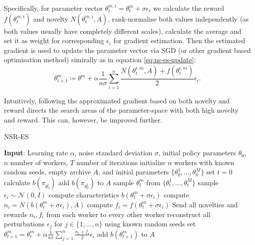 Specifically, for parameter vector $\theta_t^{m,i} = \theta_t^m+\sigma\epsilon_i$ we calculate the reward $f(\theta_t^{m,i})$ and novelty $N(\theta_t^{m,i},A)$, rank-normalise both values independently (as both values usually have completely different scales), calculate the average and set it as weight for corresponding $\epsilon_i$ for gradient estimation. Then the estimated gradient is used to update the parameter vector via SGD (or other gradient based optimisation method) simirally as in equation \ref{eq:ns-es-update}:
\begin{equation}
    \theta^m_{t+1}\coloneqq\theta^m + \alpha \frac{1}{n\sigma}\sum_{i=1}^n \dfrac{N(\theta_t^{i,m},A)+f(\theta_t^{i,m})}{2}\epsilon_i.
\end{equation}

Intuitively, following the approximated gradient based on both novelty and reward directs the search areas of the parameter-space with both high novelty and reward. This can, however, be improved further.

\begin{algorithm}
    \begin{algorithmic}[1]
    \caption{NSR-ES}
    \label{alg:nsr-es}
        \State \textbf{Input}: Learning rate $\alpha$, noise standard deviation $\sigma$, initial policy parameters $\theta_0$, $n$ number of workers, $T$ number of iterations
        \State initialize $n$ workers with known random seeds, empty archive $A$, and initial parameters $\{\theta^1_0,\dots, \theta^M_0\}$
        \State set $t=0$
            \State calculate $b(\pi_{\theta^i_0})$
            \State add $b(\pi_{\theta^i_0})$ to $A$
        \EndFor
            \State sample $\theta_t^m$ from $\{\theta^1_t,\dots, \theta^M_t\}$
                \State sample $\epsilon_i \sim \mathcal{N}(0,I)$ 
                \State compute characteristics $b(\theta^m_t+\sigma\epsilon_i)$
                \State compute $n_i = N(b(\theta^m_t+\sigma\epsilon_i), A)$
                \State compute $f_i = f(\theta^m_t+\sigma\epsilon_i)$
            \EndFor
            \State Send all novelties and rewards $n_i, f_i$ from each worker to every other worker
                \State reconstruct all perturbations $\epsilon_j $ for $j \in \{1,\dots,n\}$ using known random seeds
                \State set $\theta^m_{t+1} = \theta_t^m + \alpha \frac{1}{n\sigma}\sum_{j=1}^n\frac{n_i+f_i}{2}\epsilon_i$
                \State add $b(\theta^m_{t+1})$ to $A$
            \EndFor
        \EndFor
    \end{algorithmic}
\end{algorithm}


